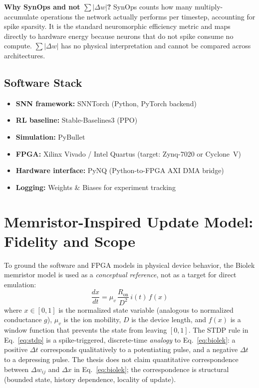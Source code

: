 \documentclass[11pt,a4paper]{article}
\begin{document}
\vspace{0.5em}
\begin{notebox}
  \textbf{Why SynOps and not $\sum|\Delta w|$?} SynOps counts how many multiply-accumulate
  operations the network actually performs per timestep, accounting for spike sparsity.
  It is the standard neuromorphic efficiency metric \cite{davies2018} and maps directly
  to hardware energy because neurons that do not spike consume no compute. $\sum|\Delta w|$
  has no physical interpretation and cannot be compared across architectures.
\end{notebox}

\subsection{Software Stack}

\begin{itemize}[leftmargin=*, itemsep=2pt]
  \item \textbf{SNN framework:} SNNTorch \cite{eshraghian2023} (Python, PyTorch backend)
  \item \textbf{RL baseline:} Stable-Baselines3 (PPO) \cite{raffin2021}
  \item \textbf{Simulation:} PyBullet \cite{coumans2021}
  \item \textbf{FPGA:} Xilinx Vivado / Intel Quartus (target: Zynq-7020 or Cyclone~V)
  \item \textbf{Hardware interface:} PyNQ (Python-to-FPGA AXI DMA bridge)
  \item \textbf{Logging:} Weights \& Biases for experiment tracking
\end{itemize}

\section{Memristor-Inspired Update Model: Fidelity and Scope}

To ground the software and FPGA models in physical device behavior, the Biolek
memristor model \cite{biolek2009} is used as a \emph{conceptual reference}, not as a
target for direct emulation:
\begin{equation}
  \frac{dx}{dt} = \mu_v\,\frac{R_{\mathrm{on}}}{D^2}\,i(t)\,f(x)
  \label{eq:biolek}
\end{equation}
where $x \in [0,1]$ is the normalized state variable (analogous to normalized
conductance $g$), $\mu_v$ is the ion mobility, $D$ is the device length, and $f(x)$ is
a window function that prevents the state from leaving $[0,1]$. The STDP rule in
Eq.~\eqref{eq:stdp} is a spike-triggered, discrete-time \emph{analogy} to
Eq.~\eqref{eq:biolek}: a positive $\Delta t$ corresponds qualitatively to a
potentiating pulse, and a negative $\Delta t$ to a depressing pulse. The thesis does
not claim quantitative correspondence between $\Delta w_{ij}$ and $\Delta x$ in
Eq.~\eqref{eq:biolek}; the correspondence is structural (bounded state, history
dependence, locality of update).
\end{document}
